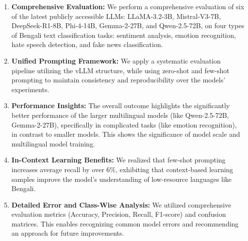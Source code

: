 \documentclass[10pt,letterpaper]{article}
\begin{document}
\begin{enumerate}
    \item \textbf{Comprehensive Evaluation:} We perform a comprehensive evaluation of six of the latest publicly accessible LLMs: LLaMA-3.2-3B, Mistral-V3-7B, DeepSeek-R1-8B, Phi-4-14B, Gemma-2-27B, and Qwen-2.5-72B, on four types of Bengali text classification tasks: sentiment analysis, emotion recognition, hate speech detection, and fake news classification.
    
    \item \textbf{Unified Prompting Framework:} We apply a systematic evaluation pipeline utilizing the vLLM structure, while using zero-shot and few-shot prompting to maintain consistency and reproducibility over the models' experiments.
    
    \item \textbf{Performance Insights:} The overall outcome highlights the significantly better performance of the larger multilingual models (like Qwen-2.5-72B, Gemma-2-27B), specifically in complicated tasks (like emotion recognition), in contrast to smaller models. This shows the significance of model scale and multilingual model training.
    
    \item \textbf{In-Context Learning Benefits:} We realized that few-shot prompting increases average recall by over 6\%, exhibiting that context-based learning samples improve the model's understanding of low-resource languages like Bengali.
    
    \item \textbf{Detailed Error and Class-Wise Analysis:} We utilized comprehensive evaluation metrics (Accuracy, Precision, Recall, F1-score) and confusion matrices. This enables recognizing common model errors and recommending an approach for future improvements.

\end{enumerate}

\end{document}
